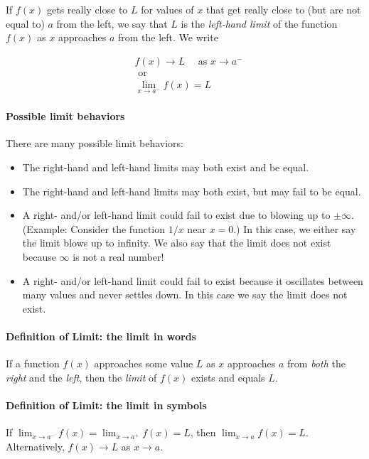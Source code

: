 \documentclass[pdftex, brazil, 12pt, twoside]{article}
\begin{document}
If $f(x)$ gets really close to $L$ for values of $x$ that get really close to (but
are not equal to) $a$ from the left, we say that $L$ is the \emph{left-hand limit}
of the function $f(x)$ as $x$ approaches $a$ from the left. We write

\begin{equation}
  \begin{split}
    &f(x) \to L \quad \text{ as } x \to a^-\\
    &\text{ or }\\
    &\lim_{x \to a^-}f(x) = L
  \end{split}
\end{equation}

\paragraph{Possible limit behaviors} There are many possible limit behaviors:
\begin{itemize}[noitemsep]
\item The right-hand and left-hand limits may both exist and be equal.
\item The right-hand and left-hand limits may both exist, but may fail to be equal.
\item A right- and/or left-hand limit could fail to exist due to blowing up to $\pm \infty$.
  (Example: Consider the function $1/x$ near $x=0$.) In this case, we either say the
  limit blows up to infinity. We also say that the limit does not exist because
  $\infty$ is not a real number!
\item A right- and/or left-hand limit could fail to exist because it oscillates
  between many values and never settles down. In this case we say the limit does not exist.
\end{itemize}

\paragraph{Definition of Limit: the limit in words} If a function $f(x)$ approaches
some value $L$ as $x$ approaches $a$ from \emph{both} the \emph{right} and the \emph{left},
then the \emph{limit} of $f(x)$ exists and equals $L$.

\paragraph{Definition of Limit: the limit in symbols} If $\displaystyle \lim_{x \to a^-}f(x) = \lim_{x \to a^+}f(x) = L$,
then $\displaystyle \lim_{x \to a}f(x) = L$. Alternatively, $f(x) \to L$ as $x \to a$.
\end{document}

